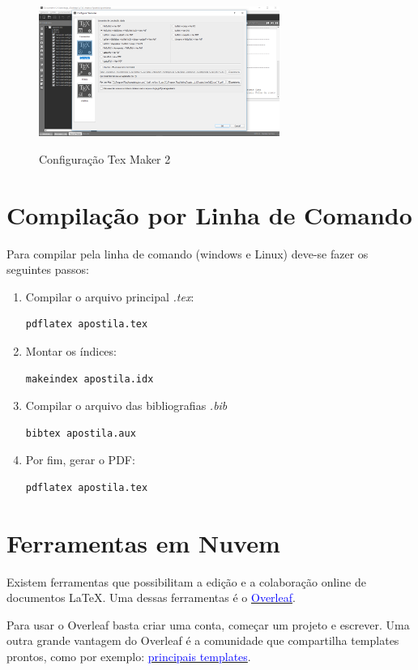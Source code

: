 \begin{figure}[H]
    \centering
    \caption{Configuração Tex Maker 2}
    \includegraphics[width=0.70\textwidth]{./dados/figuras/compiler2}
    \label{fig:texmaker-config2}
\end{figure}

\section{Compilação por Linha de Comando}

Para compilar pela linha de comando (windows e Linux) deve-se fazer os seguintes passos:

\begin{enumerate}
    \item Compilar o arquivo principal \emph{.tex}:
    \begin{lstlisting}[language=bash]
        pdflatex apostila.tex
    \end{lstlisting}
    \item Montar os índices:
    \begin{lstlisting}[language=bash]
        makeindex apostila.idx
    \end{lstlisting}
    \item Compilar o arquivo das bibliografias \emph{.bib}
    \begin{lstlisting}[language=bash]
        bibtex apostila.aux
    \end{lstlisting}
    \item Por fim, gerar o PDF:
    \begin{lstlisting}[language=bash]
        pdflatex apostila.tex
    \end{lstlisting}
\end{enumerate}

\section{Ferramentas em Nuvem}

Existem ferramentas que possibilitam a edição e a colaboração online de documentos LaTeX. Uma dessas ferramentas é o \href{https://www.overleaf.com/}{\textcolor{blue}{Overleaf}}.

Para usar o Overleaf basta criar uma conta, começar um projeto e escrever. Uma outra grande vantagem do Overleaf é a comunidade que compartilha templates prontos, como por exemplo:  \href{https://www.overleaf.com/latex/templates}{\textcolor{blue}{principais templates}}. 